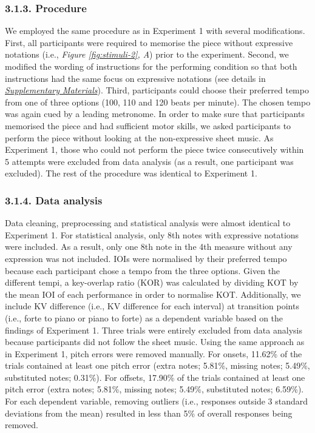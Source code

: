 \documentclass[
  english,
  man,floatsintext]{apa6}
\begin{document}
\hypertarget{procedure-2}{%
\subsubsection{3.1.3. Procedure}\label{procedure-2}}

We employed the same procedure as in Experiment 1 with several modifications. First, all participants were required to memorise the piece without expressive notations (i.e., \emph{Figure \ref{fig:stimuli-2}, A}) prior to the experiment. Second, we modified the wording of instructions for the performing condition so that both instructions had the same focus on expressive notations (see details in \emph{\protect\hyperlink{supplemental}{Supplementary Materials}}). Third, participants could choose their preferred tempo from one of three options (100, 110 and 120 beats per minute). The chosen tempo was again cued by a leading metronome. In order to make sure that participants memorised the piece and had sufficient motor skills, we asked participants to perform the piece without looking at the non-expressive sheet music. As Experiment 1, those who could not perform the piece twice consecutively within 5 attempts were excluded from data analysis (as a result, one participant was excluded). The rest of the procedure was identical to Experiment 1.

\hypertarget{data-analysis-1}{%
\subsubsection{3.1.4. Data analysis}\label{data-analysis-1}}

Data cleaning, preprocessing and statistical analysis were almost identical to Experiment 1. For statistical analysis, only 8th notes with expressive notations were included. As a result, only one 8th note in the 4th measure without any expression was not included. IOIs were normalised by their preferred tempo because each participant chose a tempo from the three options. Given the different tempi, a key-overlap ratio (KOR) was calculated by dividing KOT by the mean IOI of each performance in order to normalise KOT. Additionally, we include KV difference (i.e., KV difference for each interval) at transition points (i.e., forte to piano or piano to forte) as a dependent variable based on the findings of Experiment 1. Three trials were entirely excluded from data analysis because participants did not follow the sheet music. Using the same approach as in Experiment 1, pitch errors were removed manually. For onsets, 11.62\% of the trials contained at least one pitch error (extra notes; 5.81\%, missing notes; 5.49\%, substituted notes; 0.31\%). For offsets, 17.90\% of the trials contained at least one pitch error (extra notes; 5.81\%, missing notes; 5.49\%, substituted notes; 6.59\%). For each dependent variable, removing outliers (i.e., responses outside 3 standard deviations from the mean) resulted in less than 5\% of overall responses being removed.
\end{document}
